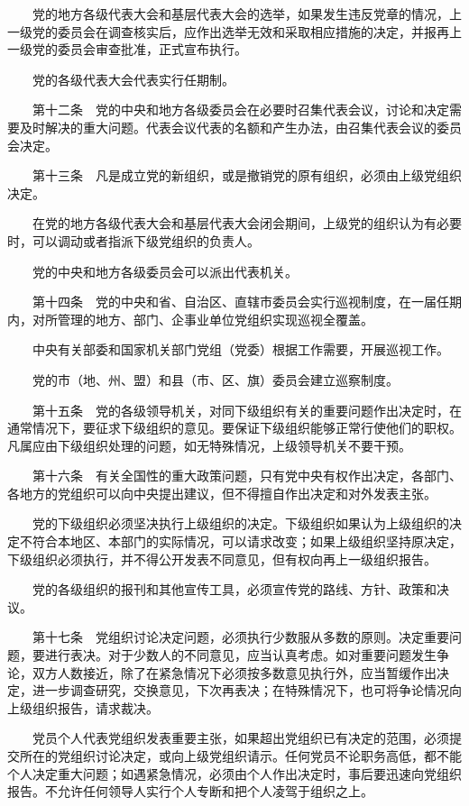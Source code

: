 　　党的地方各级代表大会和基层代表大会的选举，如果发生违反党章的情况，上一级党的委员会在调查核实后，应作出选举无效和采取相应措施的决定，并报再上一级党的委员会审查批准，正式宣布执行。

　　党的各级代表大会代表实行任期制。

　　第十二条　党的中央和地方各级委员会在必要时召集代表会议，讨论和决定需要及时解决的重大问题。代表会议代表的名额和产生办法，由召集代表会议的委员会决定。

　　第十三条　凡是成立党的新组织，或是撤销党的原有组织，必须由上级党组织决定。

　　在党的地方各级代表大会和基层代表大会闭会期间，上级党的组织认为有必要时，可以调动或者指派下级党组织的负责人。

　　党的中央和地方各级委员会可以派出代表机关。

　　第十四条　党的中央和省、自治区、直辖市委员会实行巡视制度，在一届任期内，对所管理的地方、部门、企事业单位党组织实现巡视全覆盖。

　　中央有关部委和国家机关部门党组（党委）根据工作需要，开展巡视工作。

　　党的市（地、州、盟）和县（市、区、旗）委员会建立巡察制度。

　　第十五条　党的各级领导机关，对同下级组织有关的重要问题作出决定时，在通常情况下，要征求下级组织的意见。要保证下级组织能够正常行使他们的职权。凡属应由下级组织处理的问题，如无特殊情况，上级领导机关不要干预。

　　第十六条　有关全国性的重大政策问题，只有党中央有权作出决定，各部门、各地方的党组织可以向中央提出建议，但不得擅自作出决定和对外发表主张。

　　党的下级组织必须坚决执行上级组织的决定。下级组织如果认为上级组织的决定不符合本地区、本部门的实际情况，可以请求改变；如果上级组织坚持原决定，下级组织必须执行，并不得公开发表不同意见，但有权向再上一级组织报告。

　　党的各级组织的报刊和其他宣传工具，必须宣传党的路线、方针、政策和决议。

　　第十七条　党组织讨论决定问题，必须执行少数服从多数的原则。决定重要问题，要进行表决。对于少数人的不同意见，应当认真考虑。如对重要问题发生争论，双方人数接近，除了在紧急情况下必须按多数意见执行外，应当暂缓作出决定，进一步调查研究，交换意见，下次再表决；在特殊情况下，也可将争论情况向上级组织报告，请求裁决。

　　党员个人代表党组织发表重要主张，如果超出党组织已有决定的范围，必须提交所在的党组织讨论决定，或向上级党组织请示。任何党员不论职务高低，都不能个人决定重大问题；如遇紧急情况，必须由个人作出决定时，事后要迅速向党组织报告。不允许任何领导人实行个人专断和把个人凌驾于组织之上。

